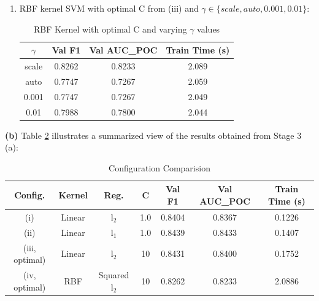\begin{enumerate}[label=\roman*., topsep=0pt, itemsep=2pt]
        From Table \ref{linear_l2_vary} it can be seen that the optimal C is 10 based on the best validation F1-score obtained.

    \item RBF kernel SVM with optimal C from (iii) and $\gamma \in \{scale, auto, 0.001, 0.01\}$:

        \begin{table}[h!]
        \caption{RBF Kernel with optimal C and varying $\gamma$ values}
        \centering
        \begin{tabular}{cccc}
            \hline
            \textbf{$\gamma$} & \textbf{Val F1} & \textbf{Val AUC\_POC} & \textbf{Train Time (s)}\\
            \hline
            scale & 0.8262 & 0.8233 & 2.089\\
            auto & 0.7747 & 0.7267 & 2.059\\
            0.001 & 0.7747 & 0.7267 & 2.049\\
            0.01 & 0.7988 & 0.7800 & 2.044\\
            \hline
        \end{tabular}
        \label{rbf}
        \end{table}
\end{enumerate}

\noindent\textbf{(b)}
Table \ref{config_comp} illustrates a summarized view of the results obtained from Stage 3 (a):
\begin{table}[htbp]
\caption{Configuration Comparision}
\centering
\begin{tabular}{|c|c|c|c|c|c|c|}
    \hline
    Config. & Kernel & Reg. & C & Val F1 & Val AUC\_POC & Train Time (s)\\
    \hline
    (i) & Linear & l$_{2}$ & 1.0 & 0.8404 & 0.8367 & 0.1226\\
    (ii) & Linear & l$_{1}$ & 1.0 & 0.8439 & 0.8433 & 0.1407\\
    (iii, optimal) & Linear & l$_{2}$ & 10 & 0.8431 & 0.8400 & 0.1752\\
    (iv, optimal) & RBF & Squared l$_{2}$ & 10 & 0.8262 & 0.8233 & 2.0886\\
    \hline
\end{tabular}
\label{config_comp}
\end{table}

